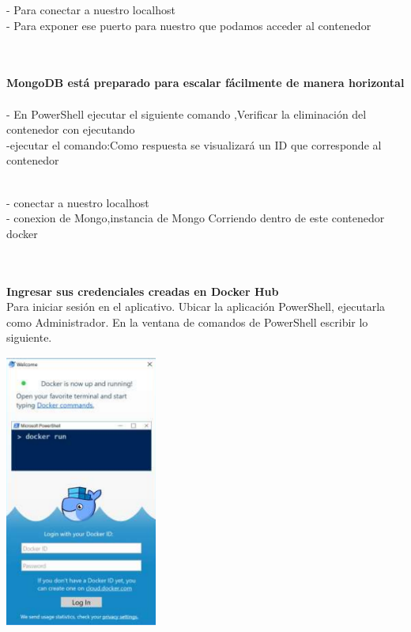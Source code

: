 \documentclass[twoside,onecolumn]{article}
\begin{document}
\begin{flushright}
\begin{itemize}
- Para conectar  a nuestro localhost 
\textbf{}\\
- Para exponer ese puerto para nuestro que podamos  acceder al contenedor

\textbf{}\\
\textbf{}\\
\textbf{ MongoDB está preparado para escalar fácilmente de manera horizontal}\\

\textbf{}\\
 - En PowerShell ejecutar el siguiente comando ,Verificar la eliminación del contenedor con ejecutando
\textbf{}\\

 -ejecutar el comando:Como respuesta se visualizará un ID que corresponde al contenedor

\textbf{}\\
 - conectar  a nuestro localhost 
\textbf{}\\
 - conexion de Mongo,instancia de Mongo Corriendo dentro de este contenedor docker 

\textbf{}\\
\textbf{}\\




\textbf{Ingresar sus credenciales creadas en Docker Hub}\\
Para iniciar sesión en el aplicativo. Ubicar la aplicación PowerShell, ejecutarla como Administrador. En la ventana de comandos de PowerShell escribir
lo siguiente.
\textbf{}\\
\begin{center}
		\includegraphics[width=5cm]{./Imagenes/1d}
		\end{center}	
\textbf{}\\
\textbf{}\\


\end{itemize}
\end{flushright}
\end{document}
